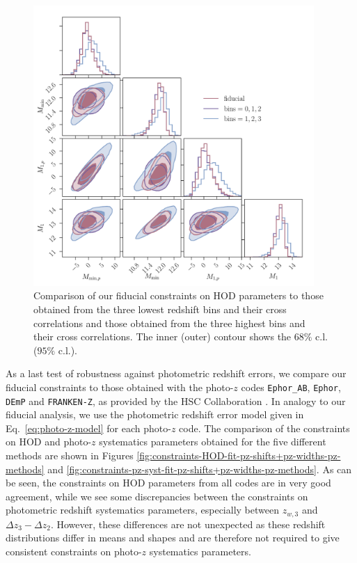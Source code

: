 \documentclass[a4paper,11pt]{article}
\begin{document}
\begin{figure}
\begin{center}
\includegraphics[width=0.95\textwidth]{figures/contours-Mmin-M1_mPk=HOD_fix=alpha-fc-sigmaM_HOD=zevol_fit=pz-shifts-pz-widths+prior=0p2_fit=auto+cross_cosmo=const_HOD-param=zfid_clfit=HOD-zevol_fit-bins=0+1+2+3-vs-fit-bins=0+1+2-vs-fit-bins=1+2+3.pdf}
\caption{Comparison of our fiducial constraints on HOD parameters to those obtained from the three lowest redshift bins and their cross correlations and those obtained from the three highest bins and their cross correlations. The inner (outer) contour shows the $68 \%$ c.l. ($95 \%$ c.l.).}
\label{fig:constraints-fit-bins=0+1+2+3-vs-fit-bins=0+1+2-vs-fit-bins=1+2+3}
\end{center}
\end{figure}

As a last test of robustness against photometric redshift errors, we compare our fiducial constraints to those obtained with the photo-$z$ codes \texttt{Ephor\_AB}, \texttt{Ephor}, \texttt{DEmP} and \texttt{FRANKEN-Z}, as provided by the HSC Collaboration \cite{2018PASJ...70S...9T}. In analogy to our fiducial analysis, we use the photometric redshift error model given in Eq.~\ref{eq:photo-z-model} for each photo-$z$ code. The comparison of the constraints on HOD and photo-$z$ systematics parameters obtained for the five different methods are shown in Figures \ref{fig:constraints-HOD-fit-pz-shifts+pz-widths-pz-methods} and \ref{fig:constraints-pz-syst-fit-pz-shifts+pz-widths-pz-methods}. As can be seen, the constraints on HOD parameters from all codes are in very good agreement, while we see some discrepancies between the constraints on photometric redshift systematics parameters, especially between $z_{w, 3}$ and $\Delta z_{3} - \Delta z_{2}$. However, these differences are not unexpected as these redshift distributions differ in means and shapes and are therefore not required to give consistent constraints on photo-$z$ systematics parameters. 
\end{document}
